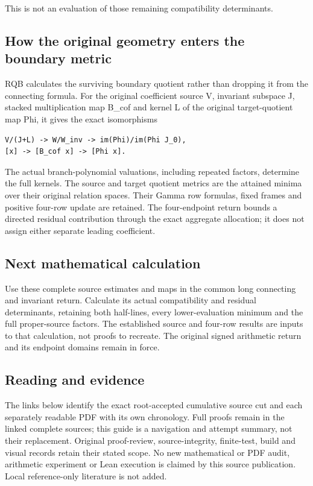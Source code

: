 \documentclass[
]{article}
\begin{document}
This is not an evaluation of those remaining compatibility determinants.

\subsection{How the original geometry enters the boundary
metric}\label{how-the-original-geometry-enters-the-boundary-metric}

RQB calculates the surviving boundary quotient rather than dropping it
from the connecting formula. For the original coefficient source V,
invariant subspace J, stacked multiplication map B\_cof and kernel L of
the original target-quotient map Phi, it gives the exact isomorphisms

\begin{verbatim}
V/(J+L) -> W/W_inv -> im(Phi)/im(Phi J_0),
[x] -> [B_cof x] -> [Phi x].
\end{verbatim}

The actual branch-polynomial valuations, including repeated factors,
determine the full kernels. The source and target quotient metrics are
the attained minima over their original relation spaces. Their Gamma row
formulas, fixed frames and positive four-row update are retained. The
four-endpoint return bounds a directed residual contribution through the
exact aggregate allocation; it does not assign either separate leading
coefficient.

\subsection{Next mathematical
calculation}\label{next-mathematical-calculation}

Use these complete source estimates and maps in the common long
connecting and invariant return. Calculate its actual compatibility and
residual determinants, retaining both half-lines, every lower-evaluation
minimum and the full proper-source factors. The established source and
four-row results are inputs to that calculation, not proofs to recreate.
The original signed arithmetic return and its endpoint domains remain in
force.

\subsection{Reading and evidence}\label{reading-and-evidence}

The links below identify the exact root-accepted cumulative source cut
and each separately readable PDF with its own chronology. Full proofs
remain in the linked complete sources; this guide is a navigation and
attempt summary, not their replacement. Original proof-review,
source-integrity, finite-test, build and visual records retain their
stated scope. No new mathematical or PDF audit, arithmetic experiment or
Lean execution is claimed by this source publication. Local
reference-only literature is not added.
\end{document}
